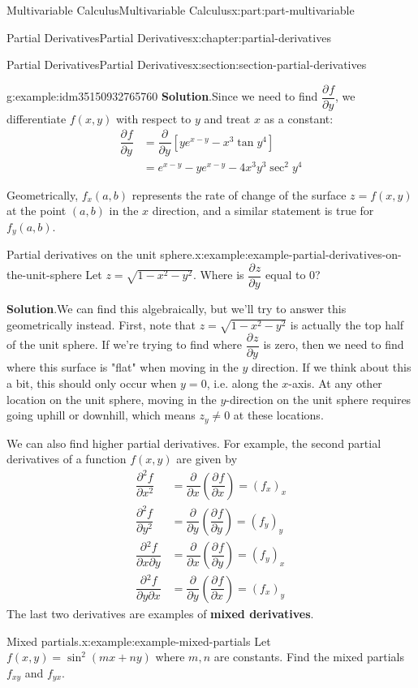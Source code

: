\documentclass[twoside,10pt,]{tufte-book}
\newcommand{\blocktitlefont}{\relax}
\newcommand{\terminology}[1]{\textbf{#1}}
\numberwithin{equation}{part}
\newcommand{\pdv}[3][]{\dfrac{\partial^{#1} #2}{\partial #3^{#1}}}
\begin{document}
\begin{partptx}{Multivariable Calculus}{}{Multivariable Calculus}{}{}{x:part:part-multivariable}
\begin{chapterptx}{Partial Derivatives}{}{Partial Derivatives}{}{}{x:chapter:partial-derivatives}
\begin{sectionptx}{Partial Derivatives}{}{Partial Derivatives}{}{}{x:section:section-partial-derivatives}
\begin{example}{}{g:example:idm35150932765760}
\noindent\textbf{\blocktitlefont Solution}.\hypertarget{g:solution:idm35150932764480}{}\quad{}Since we need to find \(\pdv{f}{y}\), we differentiate \(f(x,y)\) with respect to \(y\) and treat \(x\) as a constant:%
\begin{align*}
\pdv{f}{y} & = \pdv{}{y}\left[ye^{x-y} - x^{3}\tan y^{4}\right] \\
& = e^{x-y} - ye^{x-y} - 4x^{3}y^{3}\sec^{2}y^{4} 
\end{align*}
%
\end{example}
Geometrically, \(f_{x}(a,b)\) represents the rate of change of the surface \(z = f(x,y)\) at the point \((a,b)\) in the \(x\) direction, and a similar statement is true for \(f_{y}(a,b)\).%
\begin{example}{Partial derivatives on the unit sphere.}{x:example:example-partial-derivatives-on-the-unit-sphere}%
Let \(z = \sqrt{1-x^{2} - y^{2}}\). Where is \(\pdv{z}{y}\) equal to \(0\)?%
\par\smallskip%
\noindent\textbf{\blocktitlefont Solution}.\hypertarget{g:solution:idm35150932757440}{}\quad{}We can find this algebraically, but we'll try to answer this geometrically instead. First, note that \(z = \sqrt{1 - x^{2} - y^{2}}\) is actually the top half of the unit sphere. If we're trying to find where \(\pdv{z}{y}\) is zero, then we need to find where this surface is "flat" when moving in the \(y\) direction. If we think about this a bit, this should only occur when \(y=0\), i.e. along the \(x\)-axis. At any other location on the unit sphere, moving in the \(y\)-direction on the unit sphere requires going uphill or downhill, which means \(z_{y}\neq0\) at these locations.%
\end{example}
We can also find higher partial derivatives. For example, the second partial derivatives of a function \(f(x,y)\) are given by%
\begin{align*}
\pdv[2]{f}{x} & = \pdv{}{x}\left(\pdv{f}{x}\right) = (f_{x})_{x} \\
\pdv[2]{f}{y} & = \pdv{}{y}\left(\pdv{f}{y}\right) = (f_{y})_{y} \\
\pdv{{}^{2}f}{x\partial y} & = \pdv{}{x}\left(\pdv{f}{y}\right) = (f_{y})_{x} \\
\pdv{{}^{2}f}{y\partial x} & = \pdv{}{y}\left(\pdv{f}{x}\right) = (f_{x})_{y} 
\end{align*}
The last two derivatives are examples of \terminology{mixed derivatives}.%
\begin{example}{Mixed partials.}{x:example:example-mixed-partials}%
Let \(f(x,y) = \sin^{2}(mx+ny)\) where \(m,n\) are constants. Find the mixed partials \(f_{xy}\) and \(f_{yx}\).%

\end{example}
\end{sectionptx}
\end{chapterptx}
\end{partptx}
\end{document}
